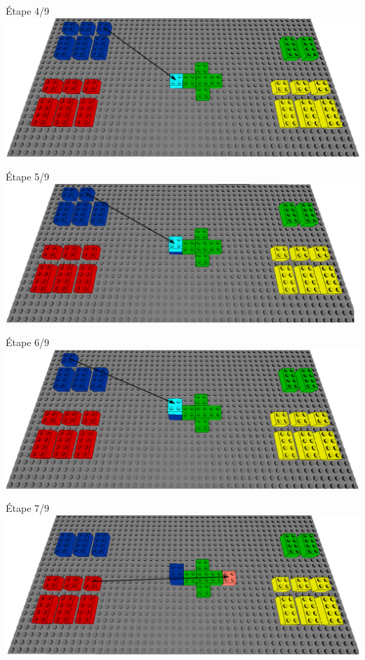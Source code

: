 \documentclass[aspectratio=169]{beamer}
\begin{document}
\begin{frame}
    Étape 4/9
    \vfill
  \includegraphics[width=\linewidth]{step4.png}
\end{frame}

\begin{frame}
    Étape 5/9
    \vfill
  \includegraphics[width=\linewidth]{step5.png}
\end{frame}

\begin{frame}
    Étape 6/9
    \vfill
  \includegraphics[width=\linewidth]{step6.png}
\end{frame}

\begin{frame}
    Étape 7/9
    \vfill
  \includegraphics[width=\linewidth]{step8.png}
\end{frame}
\end{document}
